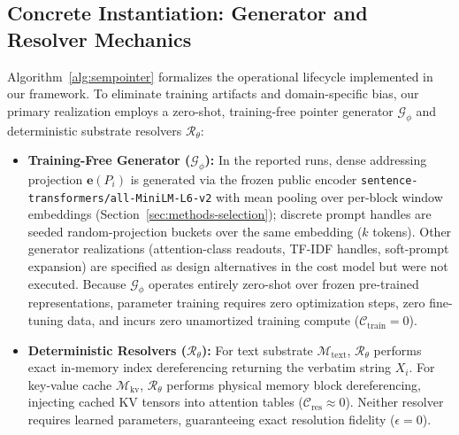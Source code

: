 \documentclass[conference]{IEEEtran}
\begin{document}
\subsection{Concrete Instantiation: Generator and Resolver Mechanics}
Algorithm~\ref{alg:sempointer} formalizes the operational lifecycle implemented in our framework. To eliminate training artifacts and domain-specific bias, our primary realization employs a zero-shot, training-free pointer generator $\mathcal{G}_\phi$ and deterministic substrate resolvers $\mathcal{R}_\theta$:
\begin{itemize}\setlength{\itemsep}{0.5pt}\setlength{\parsep}{0pt}\setlength{\topsep}{1pt}
    \item \textbf{Training-Free Generator ($\mathcal{G}_\phi$):} In the reported runs, dense addressing projection $\mathbf{e}(P_i)$ is generated via the frozen public encoder \texttt{sentence-transformers/all-MiniLM-L6-v2} with mean pooling over per-block window embeddings (Section~\ref{sec:methods-selection}); discrete prompt handles are seeded random-projection buckets over the same embedding ($k$ tokens). Other generator realizations (attention-class readouts, TF-IDF handles, soft-prompt expansion) are specified as design alternatives in the cost model but were not executed. Because $\mathcal{G}_\phi$ operates entirely zero-shot over frozen pre-trained representations, parameter training requires zero optimization steps, zero fine-tuning data, and incurs zero unamortized training compute ($\mathcal{C}_{\mathrm{train}}=0$).
    \item \textbf{Deterministic Resolvers ($\mathcal{R}_\theta$):} For text substrate $\mathcal{M}_{\mathrm{text}}$, $\mathcal{R}_\theta$ performs exact in-memory index dereferencing returning the verbatim string $X_i$. For key-value cache $\mathcal{M}_{\mathrm{kv}}$, $\mathcal{R}_\theta$ performs physical memory block dereferencing, injecting cached KV tensors into attention tables ($\mathcal{C}_{\mathrm{res}} \approx 0$). Neither resolver requires learned parameters, guaranteeing exact resolution fidelity ($\epsilon=0$).
\end{itemize}
\end{document}
